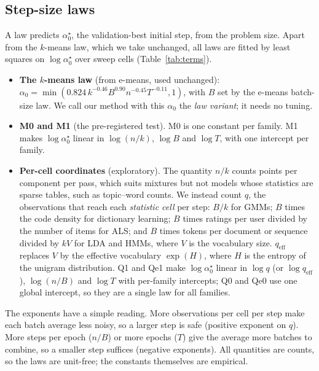 \documentclass[10pt]{article}
\newcommand{\aopt}{\alpha_0^{\star}}
\newcommand{\qeff}{q_{\mathrm{eff}}}
\begin{document}
\subsection{Step-size laws}\label{sec:laws}
A law predicts $\aopt$, the validation-best initial step, from the problem size. Apart from the $k$-means law, which we
take unchanged, all laws are fitted by least squares on $\log\aopt$ over sweep cells (Table~\ref{tab:terms}).
\begin{itemize}[nosep]
  \item \textbf{The $k$-means law} (from e-means, used unchanged): $\alpha_0 = \min(0.824\, k^{-0.46} B^{0.90}
        n^{-0.45} T^{-0.11}, 1)$, with $B$ set by the e-means batch-size law. We call our method with this
        $\alpha_0$ the \emph{law variant}; it needs no tuning.
  \item \textbf{M0 and M1} (the pre-registered test). M0 is one constant per family. M1 makes $\log\aopt$ linear in
        $\log(n/k)$, $\log B$ and $\log T$, with one intercept per family.
  \item \textbf{Per-cell coordinates} (exploratory). The quantity $n/k$ counts points per component per pass, which
        suits mixtures but not models whose statistics are sparse tables, such as topic--word counts. We instead count
        $q$, the observations that reach each \emph{statistic cell} per step: $B/k$ for GMMs; $B$ times the code
        density for dictionary learning; $B$ times ratings per user divided by the number of items for ALS; and $B$
        times tokens per document or sequence divided by $kV$ for LDA and HMMs, where $V$ is the vocabulary size.
        $\qeff$ replaces $V$ by the effective vocabulary $\exp(H)$, where $H$ is the entropy of the unigram
        distribution. Q1 and Qe1 make $\log\aopt$ linear in $\log q$ (or $\log\qeff$), $\log(n/B)$ and $\log T$ with
        per-family intercepts; Q0 and Qe0 use one global intercept, so they are a single law for all families.
\end{itemize}
The exponents have a simple reading. More observations per cell per step make each batch average less noisy, so a
larger step is safe (positive exponent on $q$). More steps per epoch ($n/B$) or more epochs ($T$) give the average
more batches to combine, so a smaller step suffices (negative exponents). All quantities are counts, so the laws are
unit-free; the constants themselves are empirical.

\end{document}
